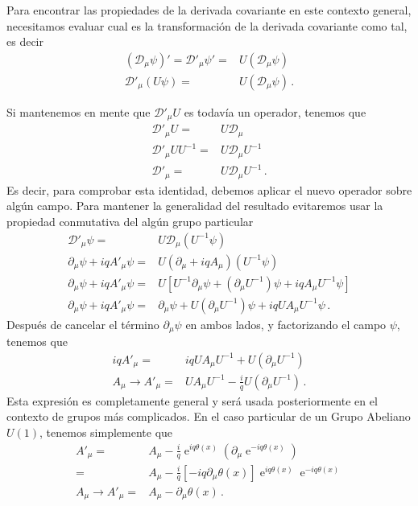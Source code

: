 \begin{subappendices}
Para encontrar las propiedades de la derivada covariante en este contexto general, necesitamos evaluar cual es la transformación de la derivada covariante como tal, es decir
\begin{align}
 \left(\mathcal{D}_\mu \psi\right)'=     \mathcal{D}'_\mu \psi'=&U\left(\mathcal{D}_\mu \psi\right)\nonumber\\
    \mathcal{D}'_\mu \left( U\psi \right)=&U\left(\mathcal{D}_\mu \psi\right)\,.
\end{align}

Si mantenemos en mente que  $\mathcal{D}'_\mu U$ es todavía un operador, tenemos que
\begin{align}
    \mathcal{D}'_\mu U=&U\mathcal{D}_\mu \nonumber\\
    \mathcal{D}'_\mu UU^{-1}=&U\mathcal{D}_\mu U^{-1} \nonumber\\
    \mathcal{D}'_\mu =&U\mathcal{D}_\mu U^{-1} \,.
\end{align}
Es decir, para comprobar esta identidad, debemos aplicar el nuevo operador sobre algún campo. Para mantener la generalidad del resultado evitaremos usar la propiedad conmutativa del algún grupo particular
\begin{align*}
    \mathcal{D}'_\mu \psi =&U\mathcal{D}_\mu \left(U^{-1}\psi  \right) \nonumber\\
    \partial_{\mu}\psi+iq A'_{\mu} \psi =&U \left(\partial_{\mu}+iq A_{\mu}  \right) \left(U^{-1}\psi  \right) \nonumber\\
    \partial_{\mu}\psi+iq A'_{\mu} \psi =&U \left[U^{-1}\partial_{\mu}\psi+\left( \partial_{\mu}U^{-1} \right)\psi+iq  A_{\mu}U^{-1}\psi\right] \nonumber\\
    \partial_{\mu}\psi+iq A'_{\mu} \psi =&\partial_{\mu}\psi+U\left( \partial_{\mu}U^{-1} \right)\psi+iq  U A_{\mu}U^{-1}\psi\,.
\end{align*}
Después de cancelar el término  $\partial_{\mu}\psi$ en ambos lados, y factorizando el campo  $\psi$, tenemos que
\begin{align}
      iq A'_{\mu} =&iq  U A_{\mu}U^{-1}+ U\left( \partial_{\mu}U^{-1} \right)\nonumber\\
      A_{\mu}\to A'_{\mu} =&U A_{\mu}U^{-1}-\frac{i}{q}U\left( \partial_{\mu}U^{-1} \right)\,.
\end{align}
Esta expresión es completamente general y será usada posteriormente en el contexto de grupos más complicados. En el caso particular de un Grupo Abeliano  $U(1)$, tenemos simplemente que
\begin{align}
  A'_{\mu}=&A_{\mu}-\frac{i}{q} \operatorname{e}^{iq\theta(x)}\left( \partial_{\mu} \operatorname{e}^{-iq\theta(x)} \right)\nonumber\\
=&A_{\mu}-\frac{i}{q}\left[ -iq\partial_{\mu}\theta(x) \right]\operatorname{e}^{iq\theta(x)} \operatorname{e}^{-iq\theta(x)}\nonumber\\
 A_{\mu}\to  A'_{\mu}=&A_{\mu}-\partial_{\mu}\theta(x)\,.
\end{align}


\end{subappendices}
